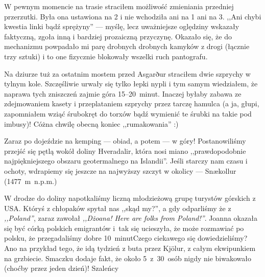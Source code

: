 W pewnym momencie na trasie straciłem możliwość zmieniania przedniej przerzutki. Była ona ustawiona na 2 i nie wchodziła ani na 1 ani na 3. ,,Ani chybi kwestia linki bądź sprężyny'' --- myślę, lecz uważniejsze oględziny wskazały faktyczną, zgoła inną i bardziej prozaiczną przyczynę. Okazało się, że do mechanizmu powpadało mi parę drobnych drobnych kamyków z drogi (łącznie trzy sztuki) i to one fizycznie blokowały wszelki ruch pantografu.

Na dziurze tuż za ostatnim mostem przed Asgarður straciłem dwie szprychy w tylnym kole. Szczęśliwie urwały się tylko łepki nypli i tym samym wiedziałem, że naprawa tych zniszczeń zajmie góra 15--20~minut. Inaczej byłaby zabawa ze zdejmowaniem kasety i przeplataniem szprychy przez tarczę hamulca (a ja, głupi, zapomniałem wziąć śrubokręt do torxów bądź wymienić te śrubki na takie pod imbusy)! Cóż\textellipsis na chwilę obecną koniec ,,rumakowania'' :)


Zaraz po dojeździe na kemping --- obiad, a potem --- w góry! Postanowiliśmy przejść się pętlą wokół doliny Hveradalir, która nosi miano ,,prawdopodobnie najpiękniejszego obszaru geotermalnego na Islandii''. Jeśli starczy nam czasu i ochoty, wdrapiemy się jeszcze na najwyższy szczyt w okolicy --- Snækollur (1477~m~n.p.m.)

W drodze do doliny napotkaliśmy liczną młodzieżową grupę turystów górskich z USA. Któryś z chłopaków spytał nas ,,skąd my?'', a gdy odparliśmy że z \emph{,,Poland''}, zaraz zawołał \emph{,,Dżoana! Here are folks from Poland!''}. Joanna okazała się być córką polskich emigrantów i~tak się ucieszyła, że może rozmawiać po polsku, że przegadaliśmy dobre 10~minut\textellipsis Czego ciekawego się dowiedzieliśmy? Ano na przykład tego, że idą tydzień z buta przez Kjölur, z całym ekwipunkiem na grzbiecie. Smaczku dodaje fakt, że około 5~z~30~osób nigdy nie biwakowało (choćby przez jeden dzień)! Szaleńcy\textellipsis



